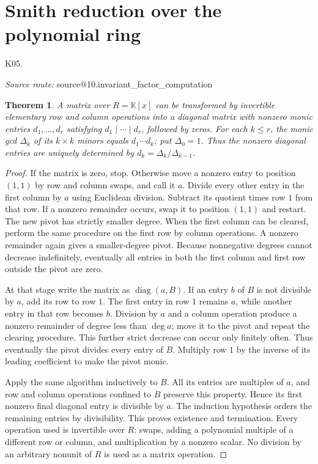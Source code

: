 \documentclass[11pt,a4paper]{book}
\makeatletter
\newtheorem{theorem}{Theorem}[chapter]
\theoremstyle{definition}\newtheorem{definition}[theorem]{Definition}
\theoremstyle{remark}\newtheorem{remark}[theorem]{Remark}
\newcommand{\K}{\mathbb K}\newcommand{\R}{\mathbb R}\newcommand{\C}{\mathbb C}
\DeclareMathOperator{\diag}{diag}\DeclareMathOperator{\id}{id}
\newcommand{\Kentry}[2]{\section{#2}\label{k:#1}\noindent\textsf{\small K05.\detokenize{#1}}\par
  \begingroup\small\color{black!65}\textit{Source route: }\csname source@#1\endcsname\par\endgroup}
\makeatother
\begin{document}
\Kentry{10.invariant_factor_computation}{Smith reduction over the polynomial ring}
\begin{theorem}\label{aux:smith-polynomial}
A matrix over $R=\K[x]$ can be transformed by invertible elementary row and column operations into a diagonal matrix with nonzero monic entries $d_1,\ldots,d_r$ satisfying $d_1\mid\cdots\mid d_r$, followed by zeros. For each $k\le r$, the monic gcd $\Delta_k$ of its $k\times k$ minors equals $d_1\cdots d_k$; put $\Delta_0=1$. Thus the nonzero diagonal entries are uniquely determined by $d_k=\Delta_k/\Delta_{k-1}$.
\end{theorem}
\begin{proof}
If the matrix is zero, stop. Otherwise move a nonzero entry to position $(1,1)$ by row and column swaps, and call it $a$. Divide every other entry in the first column by $a$ using Euclidean division. Subtract its quotient times row $1$ from that row. If a nonzero remainder occurs, swap it to position $(1,1)$ and restart. The new pivot has strictly smaller degree. When the first column can be cleared, perform the same procedure on the first row by column operations. A nonzero remainder again gives a smaller-degree pivot. Because nonnegative degrees cannot decrease indefinitely, eventually all entries in both the first column and first row outside the pivot are zero.

At that stage write the matrix as $\diag(a,B)$. If an entry $b$ of $B$ is not divisible by $a$, add its row to row $1$. The first entry in row $1$ remains $a$, while another entry in that row becomes $b$. Division by $a$ and a column operation produce a nonzero remainder of degree less than $\deg a$; move it to the pivot and repeat the clearing procedure. This further strict decrease can occur only finitely often. Thus eventually the pivot divides every entry of $B$. Multiply row $1$ by the inverse of its leading coefficient to make the pivot monic.

Apply the same algorithm inductively to $B$. All its entries are multiples of $a$, and row and column operations confined to $B$ preserve this property. Hence its first nonzero final diagonal entry is divisible by $a$. The induction hypothesis orders the remaining entries by divisibility. This proves existence and termination. Every operation used is invertible over $R$: swaps, adding a polynomial multiple of a different row or column, and multiplication by a nonzero scalar. No division by an arbitrary nonunit of $R$ is used as a matrix operation.


\end{proof}
\end{document}
